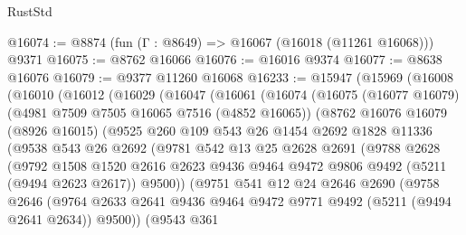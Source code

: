 \begin{lexlean}{RustStd}
\begin{coremodule}
@16074 := @8874 (fun (Γ : @8649) => @16067 (@16018 (@11261 @16068))) @9371
@16075 := @8762 @16066
@16076 := @16016 @9374
@16077 := @8638 @16076
@16079 := @9377 @11260 @16068
@16233 := @15947
    (@15969
      (@16008
        (@16010
          (@16012
            (@16029
              (@16047
                (@16061
                  (@16074
                    (@16075
                      (@16077 @16079)
                      (@4981 @7509 @7505 @16065 @7516 (@4852 @16065))
                      (@8762
                        @16076
                        @16079
                        (@8926 @16015)
                        (@9525
                          @260
                          @109
                          @543
                          @26
                          @1454
                          @2692
                          @1828
                          @11336
                          (@9538
                            @543
                            @26
                            @2692
                            (@9781
                              @542
                              @13
                              @25
                              @2628
                              @2691
                              (@9788
                                @2628
                                (@9792
                                  @1508
                                  @1520
                                  @2616
                                  @2623
                                  @9436
                                  @9464
                                  @9472
                                  @9806
                                  @9492
                                  (@5211 (@9494 @2623 @2617))
                                  @9500))
                              (@9751
                                @541
                                @12
                                @24
                                @2646
                                @2690
                                (@9758
                                  @2646
                                  (@9764
                                    @2633
                                    @2641
                                    @9436
                                    @9464
                                    @9472
                                    @9771
                                    @9492
                                    (@5211 (@9494 @2641 @2634))
                                    @9500))
                                (@9543
                                  @361

\end{coremodule}
\end{lexlean}

